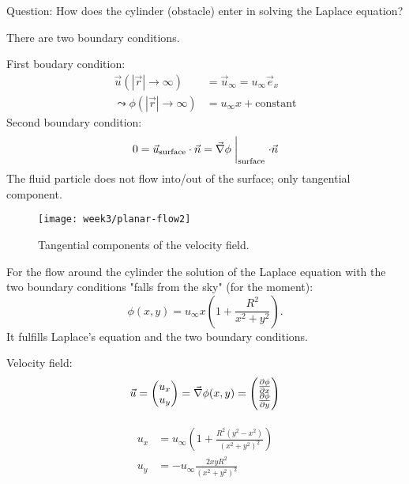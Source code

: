 Question: How does the cylinder (obstacle) enter in solving the Laplace equation?

There are two boundary conditions.

First boudary condition:
\begin{align}
\vec{u}(|\vec{r}|\rightarrow\infty) &= \vec{u}_\infty = u_\infty\vec{e}_x \\
\leadsto
\phi(|\vec{r}|\rightarrow\infty) &= u_\infty x + \mathrm{constant}
\end{align}
Second boundary condition:
\begin{equation}
0=\vec{u}_\mathrm{surface}\cdot \vec{n} = \vec{\nabla}\phi\biggm\vert_\mathrm{surface}\cdot\vec{n}
\end{equation}
The fluid particle does not flow into/out of the surface; only tangential component.

\begin{figure}[!h]
    \centering
    \texttt{[image: week3/planar-flow2]}
    \caption{Tangential components of the velocity field.}
    \label{fig:planar-flow2}
\end{figure}

For the flow around the cylinder the solution of the Laplace equation with the two boundary conditions "falls from the sky" (for the moment):
\begin{equation}\label{eq:cylinder-flow}
\phi(x,y)=u_\infty x\left(1+\frac{R^2}{x^2+y^2}\right).
\end{equation}
It fulfills Laplace's equation and the two boundary conditions.

Velocity field:
\begin{equation}
\vec{u} = \begin{pmatrix}
u_x\\u_y
\end{pmatrix}  =
\vec{\nabla}\phi(x,y) = \begin{pmatrix}
\frac{\partial \phi}{\partial x} \\
\frac{\partial \phi}{\partial y}
\end{pmatrix}
\end{equation}

\begin{align}
\begin{split}\label{eq:uxuy1}
u_x &= u_\infty\left(1+\frac{R^2(y^2-x^2)}{(x^2+y^2)^2}\right)\\
u_y &= -u_\infty \frac{2xyR^2}{(x^2+y^2)^2}
\end{split}
\end{align}

